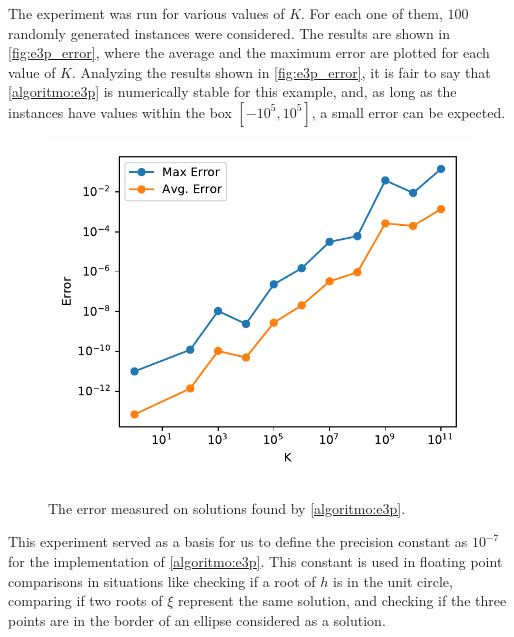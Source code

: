The experiment was run for various values of $K$. For each one of them, $100$ randomly generated instances were considered. The results are shown in \autoref{fig:e3p_error}, where the average and the maximum error are plotted for each value of $K$. Analyzing the results shown in \autoref{fig:e3p_error}, it is fair to say that \autoref{algoritmo:e3p} is numerically stable for this example, and, as long as the instances have values within the box $[-10^5, 10^5]$, a small error can be expected.

\begin{figure}[H]
	\centering
	\caption{The error measured on solutions found by \autoref{algoritmo:e3p}.}
	\includegraphics[scale=.8]{tex/figures/e3p_error}
	\fautor
	\label{fig:e3p_error}
\end{figure}

This experiment served as a basis for us to define the precision constant as $10^{-7}$ for the implementation of \autoref{algoritmo:e3p}. 
This constant is used in floating point comparisons in situations like checking if a root of $h$ is in the unit circle, comparing if two roots of $\xi$ represent the same solution, and checking if the three points are in the border of an ellipse considered as a solution.